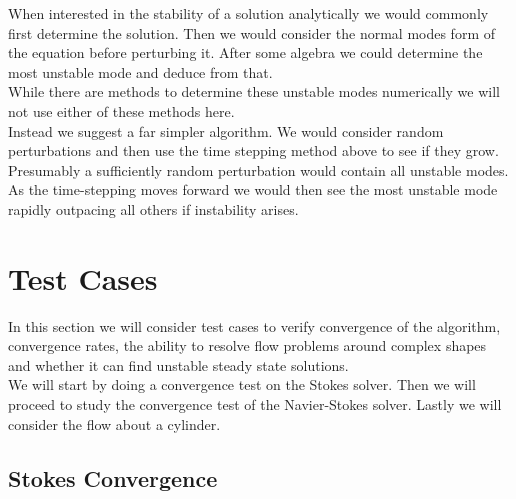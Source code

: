 \documentclass[11pt,twoside,a4paper]{article}
\begin{document}
When interested in the stability of a solution analytically we would commonly first determine the solution. Then we would consider the normal modes form of the equation before perturbing it. After some algebra we could determine the most unstable mode and deduce from that.\\
While there are methods to determine these unstable modes numerically we will not use either of these methods here.\\
Instead we suggest a far simpler algorithm.
We would consider random perturbations and then use the time stepping method above to see if they grow.\\
Presumably a sufficiently random perturbation would contain all unstable modes. As the time-stepping moves forward we would then see the most unstable mode rapidly outpacing all others if instability arises.

\section{Test Cases}
In this section we will consider test cases to verify convergence of the algorithm, convergence rates, the ability to resolve flow problems around complex shapes and whether it can find unstable steady state solutions.\\
We will start by doing a convergence test on the Stokes solver. Then we will proceed to study the convergence test of the Navier-Stokes solver. Lastly we will consider the flow about a cylinder.
\subsection{Stokes Convergence}
\end{document}
